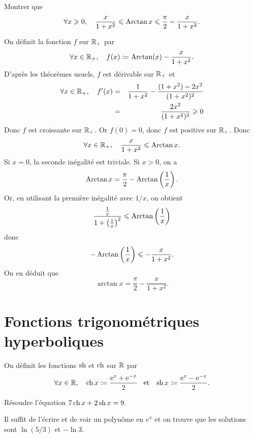 \documentclass{magnoliaold}
\begin{document}
\begin{exoUnique}
\exemple Montrer que
  \[\forall x\geqslant 0 ,\quad
    \frac{x}{1+x^2}\leqslant\operatorname{Arctan} x\leqslant\frac{\pi}{2}-\frac{x}{1+x^2}.\]
  \begin{sol}
  On définit la fonction $f$ sur $\mathbb{R}_+$ par
  \[\forall x\in\mathbb{R}_+,\quad f(x)\coloneqq \operatorname{Arctan}(x)-\frac{x}{1+x^2}.\]
  D'après les théorèmes usuels, $f$ est dérivable sur $\mathbb{R}_+$ et
  \begin{eqnarray*}
  \forall x\in\mathbb{R}_+,\quad f'(x)
  &=& \frac{1}{1+x^2}-\frac{(1+x^2)-2x^2}{(1+x^2)^2}\\
  &=& \frac{2x^2}{(1+x^2)^2}\geqslant 0
  \end{eqnarray*}
  Donc $f$ est croissante sur $\mathbb{R}_+$. Or $f(0)=0$, donc $f$ est positive sur $\mathbb{R}_+$. Donc
  \[\forall x\in\mathbb{R}_+,\quad \frac{x}{1+x^2}\leqslant\operatorname{Arctan} x.\]
  Si $x=0$, la seconde inégalité est triviale. Si $x>0$, on a
  \[\operatorname{Arctan} x =\frac{\pi}{2}-\operatorname{Arctan}\left(\frac{1}{x}\right).\]
  Or, en utilisant la première inégalité avec $1/x$, on obtient
  \[\frac{\frac{1}{x}}{1+\left(\frac{1}{x}\right)^2}\leqslant\operatorname{Arctan}\left(\frac{1}{x}\right)\]
  donc
  \[-\operatorname{Arctan}\left(\frac{1}{x}\right)\leqslant -\frac{x}{1+x^2}.\]
  On en déduit que
  \[\arctan x =\frac{\pi}{2}-\frac{x}{1+x^2}.\]
  \end{sol}
\end{exoUnique}

\section{Fonctions trigonométriques hyperboliques}

\begin{definition}[utile=-3]
On définit les fonctions $\operatorname{sh}$ et $\operatorname{ch}$ sur $\mathbb{R}$ par
\[\forall x\in\mathbb{R} ,\quad \operatorname{ch} x\coloneqq\frac{{\rm e}^x+{\rm e}^{-x}}{2} \quad\!\text{et}\quad\!
                       \operatorname{sh} x\coloneqq\frac{{\rm e}^x-{\rm e}^{-x}}{2}.\]
\end{definition}

\begin{exoUnique}
\exo Résoudre l'équation $7\operatorname{ch} x+2\operatorname{sh} x=9$.
  \begin{sol}
  Il suffit de l'écrire et de voir un polynôme en $e^x$ et on trouve que les solutions sont $\ln(5/3)$ et $-\ln 3$.
  \end{sol}
\end{exoUnique}
\end{document}
